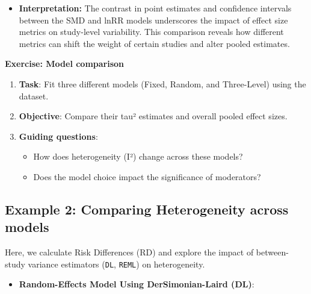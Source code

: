\documentclass[
]{book}
\newenvironment{Shaded}{\begin{snugshade}}{\end{snugshade}}
\newcommand{\AttributeTok}[1]{\textcolor[rgb]{0.13,0.29,0.53}{#1}}
\newcommand{\FunctionTok}[1]{\textcolor[rgb]{0.13,0.29,0.53}{\textbf{#1}}}
\newcommand{\NormalTok}[1]{#1}
\newcommand{\OtherTok}[1]{\textcolor[rgb]{0.56,0.35,0.01}{#1}}
\newcommand{\SpecialCharTok}[1]{\textcolor[rgb]{0.81,0.36,0.00}{\textbf{#1}}}
\newcommand{\StringTok}[1]{\textcolor[rgb]{0.31,0.60,0.02}{#1}}
\providecommand{\tightlist}{%
  \setlength{\itemsep}{0pt}\setlength{\parskip}{0pt}}
\begin{document}
\begin{itemize}
\tightlist
\item
  \textbf{Interpretation:} The contrast in point estimates and confidence intervals between the SMD and lnRR models underscores the impact of effect size metrics on study-level variability. This comparison reveals how different metrics can shift the weight of certain studies and alter pooled estimates.
\end{itemize}

\textbf{Exercise: Model comparison}

\begin{enumerate}
\def\labelenumi{\arabic{enumi}.}
\item
  \textbf{Task}: Fit three different models (Fixed, Random, and Three-Level) using the dataset.
\item
  \textbf{Objective}: Compare their tau² estimates and overall pooled effect sizes.
\item
  \textbf{Guiding questions}:

  \begin{itemize}
  \item
    How does heterogeneity (I²) change across these models?
  \item
    Does the model choice impact the significance of moderators?
  \end{itemize}
\end{enumerate}

\subsection{Example 2: Comparing Heterogeneity across models}\label{example-2-comparing-heterogeneity-across-models}

Here, we calculate Risk Differences (RD) and explore the impact of between-study variance estimators (\texttt{DL}, \texttt{REML}) on heterogeneity.

\begin{itemize}
\tightlist
\item
  \textbf{Random-Effects Model Using DerSimonian-Laird (DL)}:
\end{itemize}

\begin{Shaded}
\end{Shaded}
\end{document}

